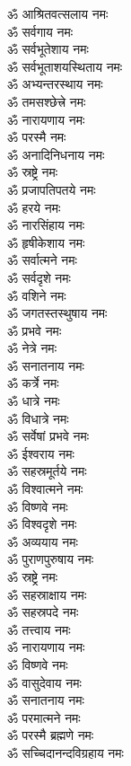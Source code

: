 \begin{multicols}{2}
\begin{flushleft}
ॐ आश्रितवत्सलाय नमः\\
ॐ सर्वगाय नमः\\
ॐ सर्वभूतेशाय नमः\\
ॐ सर्वभूताशयस्थिताय नमः\\
ॐ अभ्यन्तरस्थाय नमः\\
ॐ तमसश्छेत्त्रे नमः\\
ॐ नारायणाय नमः\\
ॐ परस्मै नमः\\
ॐ अनादिनिधनाय नमः\\
ॐ स्रष्ट्रे नमः\hfill{}\\
ॐ प्रजापतिपतये नमः\\
ॐ हरये नमः\\
ॐ नारसिंहाय नमः\\
ॐ हृषीकेशाय नमः\\
ॐ सर्वात्मने नमः\\
ॐ सर्वदृशे नमः\\
ॐ वशिने नमः\\
ॐ जगतस्तस्थुषाय नमः\\
ॐ प्रभवे नमः\\
ॐ नेत्रे नमः\hfill{}\\
ॐ सनातनाय नमः\\
ॐ कर्त्रे नमः\\
ॐ धात्रे नमः\\
ॐ विधात्रे नमः\\
ॐ सर्वेषां प्रभवे नमः\\
ॐ ईश्वराय नमः\\
ॐ सहस्रमूर्तये नमः\\
ॐ विश्वात्मने नमः\\
ॐ विष्णवे नमः\\
ॐ विश्वदृशे नमः\hfill{}\\
ॐ अव्ययाय नमः\\
ॐ पुराणपुरुषाय नमः\\
ॐ स्रष्ट्रे नमः\\
ॐ सहस्राक्षाय नमः\\
ॐ सहस्रपदे नमः\\
ॐ तत्त्वाय नमः\\
ॐ नारायणाय नमः\\
ॐ विष्णवे नमः\\
ॐ वासुदेवाय नमः\\
ॐ सनातनाय नमः\hfill{}\\
ॐ परमात्मने नमः\\
ॐ परस्मै ब्रह्मणे नमः\\
ॐ सच्चिदानन्दविग्रहाय नमः\\

\end{flushleft}
\end{multicols}
